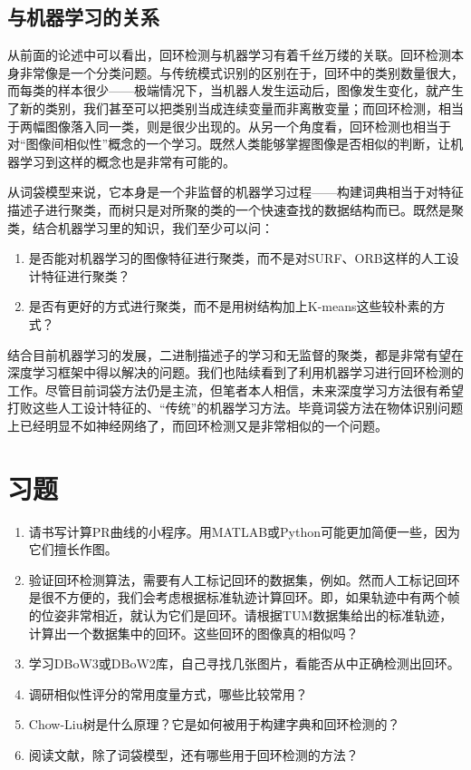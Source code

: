 \subsection{与机器学习的关系}
从前面的论述中可以看出，回环检测与机器学习有着千丝万缕的关联。回环检测本身非常像是一个分类问题。与传统模式识别的区别在于，回环中的类别数量很大，而每类的样本很少——极端情况下，当机器人发生运动后，图像发生变化，就产生了新的类别，我们甚至可以把类别当成连续变量而非离散变量；而回环检测，相当于两幅图像落入同一类，则是很少出现的。从另一个角度看，回环检测也相当于对“图像间相似性”概念的一个学习。既然人类能够掌握图像是否相似的判断，让机器学习到这样的概念也是非常有可能的。

从词袋模型来说，它本身是一个非监督的机器学习过程——构建词典相当于对特征描述子进行聚类，而树只是对所聚的类的一个快速查找的数据结构而已。既然是聚类，结合机器学习里的知识，我们至少可以问：

\begin{enumerate}
	\item 是否能对机器学习的图像特征进行聚类，而不是对SURF、ORB这样的人工设计特征进行聚类？
	\item 是否有更好的方式进行聚类，而不是用树结构加上K-means这些较朴素的方式？
\end{enumerate}

结合目前机器学习的发展，二进制描述子的学习和无监督的聚类，都是非常有望在深度学习框架中得以解决的问题。我们也陆续看到了利用机器学习进行回环检测的工作。尽管目前词袋方法仍是主流，但笔者本人相信，未来深度学习方法很有希望打败这些人工设计特征的、“传统”的机器学习方法\textsuperscript{\cite{Gao2015, Gao2015b}}。毕竟词袋方法在物体识别问题上已经明显不如神经网络了，而回环检测又是非常相似的一个问题。

\section*{习题}
\begin{enumerate}
	\item 请书写计算PR曲线的小程序。用MATLAB或Python可能更加简便一些，因为它们擅长作图。
	\item 验证回环检测算法，需要有人工标记回环的数据集，例如\cite{Cummins2008}。然而人工标记回环是很不方便的，我们会考虑根据标准轨迹计算回环。即，如果轨迹中有两个帧的位姿非常相近，就认为它们是回环。请根据TUM数据集给出的标准轨迹，计算出一个数据集中的回环。这些回环的图像真的相似吗？
	\item 学习DBoW3或DBoW2库，自己寻找几张图片，看能否从中正确检测出回环。
	\item 调研相似性评分的常用度量方式，哪些比较常用？
	\item Chow-Liu树是什么原理？它是如何被用于构建字典和回环检测的？
	\item 阅读文献\cite{Williams2009}，除了词袋模型，还有哪些用于回环检测的方法？
\end{enumerate}
